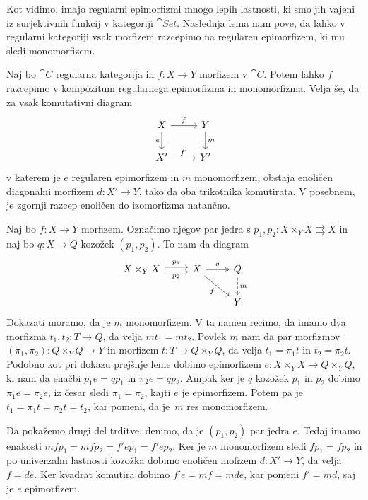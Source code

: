 \documentclass[../kategoricna_logika.tex]{subfiles}
\begin{document}
\noindent
Kot vidimo, imajo regularni epimorfizmi mnogo lepih lastnosti, ki smo jih vajeni iz surjektivnih funkcij v kategoriji $\cat{Set}$.
Naslednja lema nam pove, da lahko v regularni kategoriji vsak morfizem razcepimo na regularen epimorfizem,
ki mu sledi monomorfizem. 
\begin{lema}
  Naj bo $\cat{C}$ regularna kategorija in $f: X \to Y$ morfizem v $\cat{C}$.
  Potem lahko $f$ razcepimo v kompozitum regularnega epimorfizma in monomorfizma.
  Velja še, da za vsak komutativni diagram
  \begin{equation*}
  \begin{tikzcd}
      X \ar[d, "e"'] \ar[r, "f"] & Y \ar[d, "m"] \\
      X' \ar[r, "f'"] & Y'
  \end{tikzcd}
  \end{equation*}
  v katerem je $e$ regularen epimorfizem in $m$ monomorfizem,
  obstaja enoličen diagonalni morfizem $d : X' \to Y$, tako da oba trikotnika komutirata.
  V posebnem, je zgornji razcep enoličen do izomorfizma natančno.
\end{lema}
\begin{dokaz}
Naj bo $f : X \to Y$ morfizem.
Označimo njegov par jedra s $p_1, p_2 : X \times_Y X \rightrightarrows X$
in naj bo $q : X \to Q$ kozožek $(p_1, p_2)$.
To nam da diagram
\begin{equation*}
\begin{tikzcd}
  X \times_Y X \ar[r, shift left, "p_1"] \ar[r, shift right, "p_2"'] & X \ar[dr, "f"'] \ar[r, two heads, "q"] & Q \ar[d, dashed, "m"] \\
  & & Y
\end{tikzcd}
\end{equation*}
Dokazati moramo, da je $m$ monomorfizem. V ta namen recimo, da imamo dva morfizma $t_1, t_2 : T \to Q$,
da velja $m t_1 = m t_2$. Povlek $m$ nam da par morfizmov $(\pi_1, \pi_2) : Q \times_Y Q \to Y$
in morfizem $t : T \to  Q \times_Y Q$, da velja $t_1 = \pi_1 t$ in $t_2 = \pi_2 t$.
Podobno kot pri dokazu prejšnje leme dobimo epimorfizem $e : X \times_Y X \to Q \times_Y Q$,
ki nam da enačbi $p_1 e = q p_1$ in $\pi_2 e = q p_2$.
Ampak ker je $q$ kozožek $p_1$ in $p_2$ dobimo $\pi_1 e = \pi_2 e$, iz česar sledi $\pi_1 = \pi_2$, 
kajti $e$ je epimorfizem.
Potem pa je $t_1 = \pi_1 t = \pi_2 t = t_2$, kar pomeni, da je~$m$ res monomorfizem.

Da pokažemo drugi del trditve, denimo, da je $(p_1, p_2)$ par jedra $e$.
Tedaj imamo enakosti $m f p_1 = m f p_2 = f' e p_1 = f' e p_2$.
Ker je $m$ monomorfizem sledi $f p_1 = f p_2$ in po univerzalni lastnosti kozožka dobimo enoličen mofizem $d : X' \to Y$,
da velja $f = d e$. Ker kvadrat komutira dobimo $f' e = m f = m d e$, kar pomeni $f' = m d$, saj je $e$ epimorfizem.
\end{dokaz}
\end{document}
